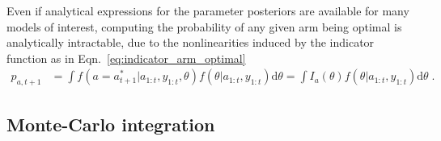 \documentclass{article}
\begin{document}
Even if analytical expressions for the parameter posteriors are available for many models of interest, computing the probability of any given arm being optimal is analytically intractable, due to the nonlinearities induced by the indicator function as in Eqn.~\eqref{eq:indicator_arm_optimal}
\begin{equation}
\begin{split}
p_{a,t+1} &=\int f(a=a^*_{t+1}|a_{1:t}, y_{1:t}, \theta) f(\theta|a_{1:t}, y_{1:t}) \mathrm{d}\theta = \int I_a(\theta) f(\theta|a_{1:t}, y_{1:t}) \mathrm{d}\theta \; .
\label{eq:pr_arm_optimal_bayes_indicator}
\end{split}
\end{equation}

\subsection{Monte-Carlo integration}
\label{ssec:mc_integration}
\end{document}

